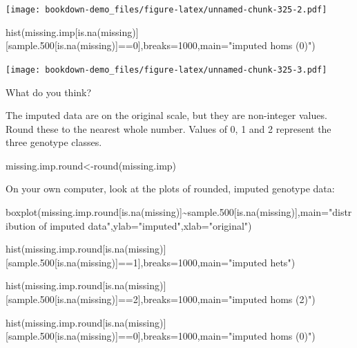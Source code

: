 \documentclass[
]{book}
\newenvironment{Shaded}{\begin{snugshade}}{\end{snugshade}}
\newcommand{\AttributeTok}[1]{\textcolor[rgb]{0.77,0.63,0.00}{#1}}
\newcommand{\DecValTok}[1]{\textcolor[rgb]{0.00,0.00,0.81}{#1}}
\newcommand{\FloatTok}[1]{\textcolor[rgb]{0.00,0.00,0.81}{#1}}
\newcommand{\FunctionTok}[1]{\textcolor[rgb]{0.00,0.00,0.00}{#1}}
\newcommand{\NormalTok}[1]{#1}
\newcommand{\OtherTok}[1]{\textcolor[rgb]{0.56,0.35,0.01}{#1}}
\newcommand{\SpecialCharTok}[1]{\textcolor[rgb]{0.00,0.00,0.00}{#1}}
\newcommand{\StringTok}[1]{\textcolor[rgb]{0.31,0.60,0.02}{#1}}
\begin{document}
\texttt{[image: bookdown-demo\_files/figure-latex/unnamed-chunk-325-2.pdf]}

\begin{Shaded}
\begin{Highlighting}[]
\FunctionTok{hist}\NormalTok{(missing.imp[}\FunctionTok{is.na}\NormalTok{(missing)][sample}\FloatTok{.500}\NormalTok{[}\FunctionTok{is.na}\NormalTok{(missing)]}\SpecialCharTok{==}\DecValTok{0}\NormalTok{],}\AttributeTok{breaks=}\DecValTok{1000}\NormalTok{,}\AttributeTok{main=}\StringTok{"imputed homs (0)"}\NormalTok{) }
\end{Highlighting}
\end{Shaded}

\texttt{[image: bookdown-demo\_files/figure-latex/unnamed-chunk-325-3.pdf]}

What do you think?

The imputed data are on the original scale, but they are non-integer values. Round these to the nearest whole number. Values of 0, 1 and 2 represent the three genotype classes.

\begin{Shaded}
\begin{Highlighting}[]
\NormalTok{missing.imp.round}\OtherTok{\textless{}{-}}\FunctionTok{round}\NormalTok{(missing.imp)}
\end{Highlighting}
\end{Shaded}

On your own computer, look at the plots of rounded, imputed genotype data:

\begin{Shaded}
\begin{Highlighting}[]
\FunctionTok{boxplot}\NormalTok{(missing.imp.round[}\FunctionTok{is.na}\NormalTok{(missing)]}\SpecialCharTok{\textasciitilde{}}\NormalTok{sample}\FloatTok{.500}\NormalTok{[}\FunctionTok{is.na}\NormalTok{(missing)],}\AttributeTok{main=}\StringTok{"distribution of imputed data"}\NormalTok{,}\AttributeTok{ylab=}\StringTok{"imputed"}\NormalTok{,}\AttributeTok{xlab=}\StringTok{"original"}\NormalTok{)}

\FunctionTok{hist}\NormalTok{(missing.imp.round[}\FunctionTok{is.na}\NormalTok{(missing)][sample}\FloatTok{.500}\NormalTok{[}\FunctionTok{is.na}\NormalTok{(missing)]}\SpecialCharTok{==}\DecValTok{1}\NormalTok{],}\AttributeTok{breaks=}\DecValTok{1000}\NormalTok{,}\AttributeTok{main=}\StringTok{"imputed hets"}\NormalTok{)}

\FunctionTok{hist}\NormalTok{(missing.imp.round[}\FunctionTok{is.na}\NormalTok{(missing)][sample}\FloatTok{.500}\NormalTok{[}\FunctionTok{is.na}\NormalTok{(missing)]}\SpecialCharTok{==}\DecValTok{2}\NormalTok{],}\AttributeTok{breaks=}\DecValTok{1000}\NormalTok{,}\AttributeTok{main=}\StringTok{"imputed homs (2)"}\NormalTok{)}

\FunctionTok{hist}\NormalTok{(missing.imp.round[}\FunctionTok{is.na}\NormalTok{(missing)][sample}\FloatTok{.500}\NormalTok{[}\FunctionTok{is.na}\NormalTok{(missing)]}\SpecialCharTok{==}\DecValTok{0}\NormalTok{],}\AttributeTok{breaks=}\DecValTok{1000}\NormalTok{,}\AttributeTok{main=}\StringTok{"imputed homs (0)"}\NormalTok{) }
\end{Highlighting}
\end{Shaded}
\end{document}
